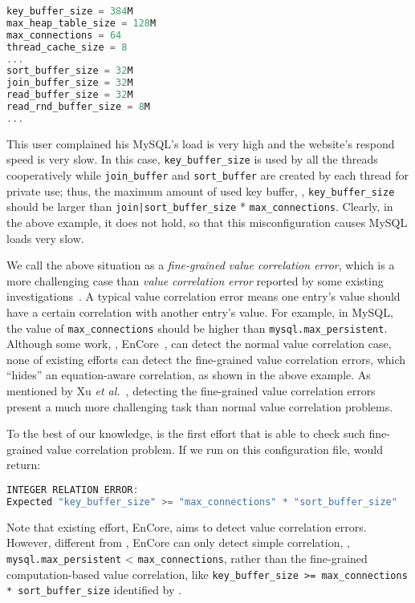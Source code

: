 \begin{lstlisting}[language=C, xleftmargin=.01\textwidth]
key_buffer_size = 384M
max_heap_table_size = 128M
max_connections = 64
thread_cache_size = 8
...
sort_buffer_size = 32M
join_buffer_size = 32M
read_buffer_size = 32M
read_rnd_buffer_size = 8M
...
\end{lstlisting} 

This user complained his MySQL's load is very high and the website's
respond speed is very slow.
In this case, {\tt key\_buffer\_size} is used by all the threads
cooperatively while {\tt join\_buffer} and {\tt sort\_buffer} are 
created by each thread for private use; thus, the maximum amount
of used key buffer, \ie, {\tt key\_buffer\_size} should be larger than 
{\tt join|sort\_buffer\_size} * {\tt max\_connections}. 
Clearly, in the above example, it does not hold, 
so that this misconfiguration causes MySQL loads very slow.

We call the above situation as a {\em fine-grained value correlation
error}, which is a more challenging case than 
{\em value correlation error} reported
by some existing investigations~\cite{yin11anempirical, zhang14encore}.
A typical value correlation error
means one entry's value should have a certain correlation with
another entry's value. For example, in MySQL,
the value of {\tt max\_connections} should be higher than
{\tt mysql.max\_persistent}. Although some work, \eg,
EnCore~\cite{zhang14encore}, can detect the normal value
correlation case, 
none of existing efforts can detect the fine-grained value correlation
errors, which ``hides'' an equation-aware correlation, as shown in
the above example.
As mentioned by Xu {\em et al.}~\cite{xu15hey},
detecting the fine-grained value correlation errors 
present a much more challenging
task than normal value correlation problems.

To the best of our knowledge, \app is the first effort that
is able to check such fine-grained value correlation problem.
If we run \app on this configuration file, \app  would return:

\begin{lstlisting}[language=C, xleftmargin=.01\textwidth]
INTEGER RELATION ERROR:
Expected "key_buffer_size" >= "max_connections" * "sort_buffer_size"
\end{lstlisting} 

Note that existing effort, EnCore, aims to detect value correlation 
errors. However, different from \app, EnCore can only detect simple
correlation, \eg, {\tt mysql.max\_persistent} < {\tt max\_connections},
rather than the fine-grained computation-based value correlation,
like {\tt key\_buffer\_size >= max\_connections * sort\_buffer\_size}
identified by \app.

